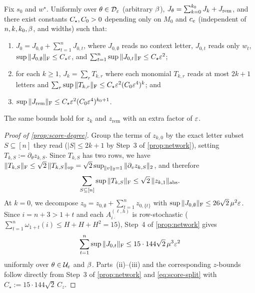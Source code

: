 \begin{proposition}
\label{prop:score-degree}
Fix $s_0$ and $w^\star$. Uniformly over $\theta \in \mathcal D_{\varepsilon}$ (arbitrary $\beta$), $J_\theta = \sum_{k=0}^{k_0} J_k + J_{\mathrm{rem}}$, and there exist constants $C_\star, C_0 > 0$ depending only on $M_0$ and $c_e$ (independent of $n, k, k_0, \beta$, and widths) such that:
\begin{enumerate}[label=(\roman*),leftmargin=*]
\item $J_0 = J_{0,\emptyset} + \sum_{t=1}^n J_{0,t}$, where $J_{0,\emptyset}$ reads no context letter, $J_{0,t}$ reads only $w_t$, $\sup \|J_{0,\emptyset}\|_{\mathrm{F}} \le C_\star\varepsilon$, and $\sum_{t=1}^n \sup \|J_{0,t}\|_{\mathrm{F}} \le C_\star\varepsilon^2$;
\item for each $k \ge 1$, $J_k = \sum_r T_{k,r}$ where each monomial $T_{k,r}$ reads at most $2k + 1$ letters and $\sum_r \sup \|T_{k,r}\|_{\mathrm{F}} \le C_\star\varepsilon^2(C_0\varepsilon^4)^k$; and
\item $\sup \|J_{\mathrm{rem}}\|_{\mathrm{F}} \le C_\star\varepsilon^2(C_0\varepsilon^4)^{k_0+1}$.
\end{enumerate}
The same bounds hold for $z_k$ and $z_{\mathrm{rem}}$ with an extra factor of $\varepsilon$.
\end{proposition}
\begin{proof}[Proof of \cref{prop:score-degree}]
Group the terms of $z_{k,0}$ by the exact letter subset $S \subseteq [n]$ they read ($|S| \le 2k+1$ by Step~3 of \cref{prop:network}), setting $T_{k,S} := \partial_\theta z_{k,S}$. Since $T_{k,S}$ has two rows, we have $\|T_{k,S}\|_{\mathrm{F}} \le \sqrt 2\,\|T_{k,S}\|_{\mathrm{op}} = \sqrt 2\sup_{\|v\|_2=1}\|\partial_v z_{k,S}\|_2$, and therefore
\[
  \sum_{S\subseteq [n]} \sup\|T_{k,S}\|_{\mathrm{F}} \le \sqrt 2\,\|z_{k,1}\|_{\mathrm{abs}}.
\]
At $k = 0$, we decompose $z_0 = z_{0,\emptyset} + \sum_{t=1}^n z_{0,\{t\}}$ with $\sup\|J_{0,\emptyset}\|_{\mathrm{F}} \le 26\sqrt 2\,\mu^2\varepsilon$. Since $i = n+3 > 1+t$ and each $A_{i\cdot}^{(\ell,h)}$ is row-stochastic ($\sum_{t=1}^n \omega_{1+t}(i) \le H + H + H^2 = 15$), Step~4 of \cref{prop:network} gives
\[
  \sum_{t=1}^n \sup\|J_{0,t}\|_{\mathrm{F}} \le 15\cdot 144\sqrt 2\,\mu^3\varepsilon^2
\]
uniformly over $\theta \in \mathcal U_{\varepsilon}$ and $\beta$. Parts~(ii)--(iii) and the corresponding $z$-bounds follow directly from Step~3 of \cref{prop:network} and \cref{eq:score-split} with $C_\star := 15\cdot 144\sqrt 2\,C_z$.
\end{proof}

